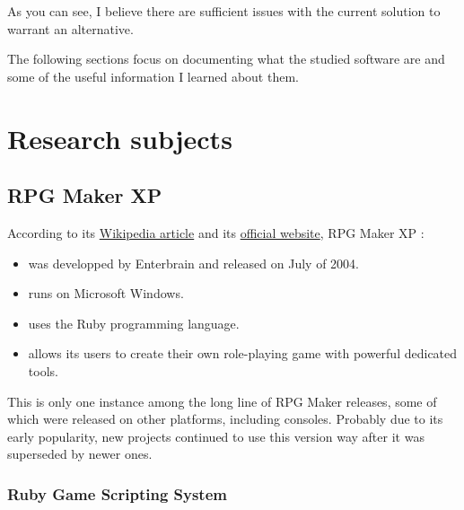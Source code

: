 \documentclass[11pt]{article}
\begin{document}
\vspace{4mm}
As you can see, I believe there are sufficient issues with the current solution to warrant an alternative.

The following sections focus on documenting what the studied software are and some of the useful information I learned about them.







\newpage

\section{Research subjects}
\subsection{RPG Maker XP}


According to its \href{https://en.wikipedia.org/wiki/RPG_Maker#RPG_Maker_series_timeline}{Wikipedia article} and its \href{https://www.rpgmakerweb.com/products/programs/rpg-maker-xp}{official website}, RPG Maker XP :
\begin{itemize}
	\item was developped by Enterbrain and released on July of 2004.
	
	\item runs on Microsoft Windows.
	
	\item uses the Ruby programming language.
	
	\item allows its users to create their own role-playing game with powerful dedicated tools.
\end{itemize}

This is only one instance among the long line of RPG Maker releases, some of which were released on other platforms, including consoles. Probably due to its early popularity, new projects continued to use this version way after it was superseded by newer ones.




\subsubsection{Ruby Game Scripting System}
\end{document}
